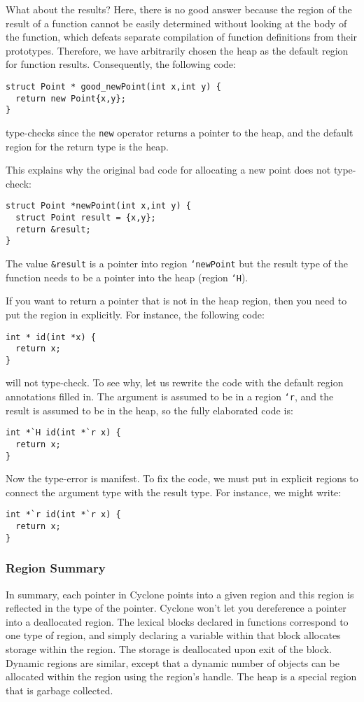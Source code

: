 What about the results?  Here, there is no good answer because
the region of the result of a function cannot be easily determined
without looking at the body of the function, which defeats separate
compilation of function definitions from their prototypes.  Therefore,
we have arbitrarily chosen the heap as the default region for
function results.  Consequently, the following code:
\begin{verbatim}
struct Point * good_newPoint(int x,int y) {
  return new Point{x,y};
}
\end{verbatim}
type-checks since the \texttt{new} operator returns a pointer
to the heap, and the default region for the return type is the heap.

This explains why the original bad code for allocating a new
point does not type-check:
\begin{verbatim}
struct Point *newPoint(int x,int y) {
  struct Point result = {x,y};
  return &result;
}
\end{verbatim}
The value \texttt{\&result} is a pointer into region \texttt{`newPoint}
but the result type of the function needs to be a pointer into
the heap (region \texttt{`H}).  

If you want to return a pointer that is not in the heap region,
then you need to put the region in explicitly.  For instance,
the following code:
\begin{verbatim}
int * id(int *x) {
  return x;
}
\end{verbatim}
will not type-check.  To see why, let us rewrite the
code with the default region annotations filled in.  The argument
is assumed to be in a region \texttt{`r}, and the result is assumed to be
in the heap, so the fully elaborated code is:
\begin{verbatim}
int *`H id(int *`r x) {
  return x;
}
\end{verbatim}
Now the type-error is manifest.  To fix the code, we must put in
explicit regions to connect the argument type with the result type.
For instance, we might write:
\begin{verbatim}
int *`r id(int *`r x) {
  return x;
}
\end{verbatim}

\subsubsection*{Region Summary}

In summary, each pointer in Cyclone points into a given region
and this region is reflected in the type of the pointer.  Cyclone
won't let you dereference a pointer into a deallocated region.
The lexical blocks declared in functions correspond to one
type of region, and simply declaring a variable within that
block allocates storage within the region.  The storage is
deallocated upon exit of the block.  Dynamic regions are
similar, except that a dynamic number of objects can be allocated
within the region using the region's handle.  The heap is a
special region that is garbage collected.  

